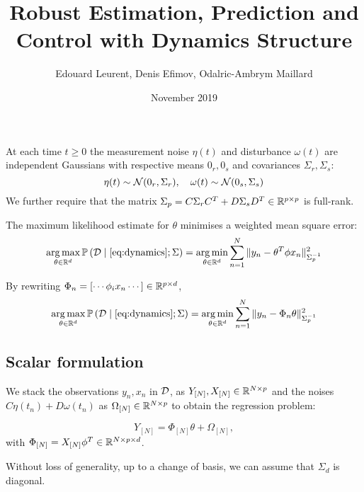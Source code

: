\documentclass{article}
\title{Robust Estimation, Prediction and Control with Dynamics Structure}
\author{Edouard Leurent, Denis Efimov, Odalric-Ambrym Maillard}
\date{November 2019}
\begin{document}
\begin{assumption}
\label{assumpt:noise}
At each time $t\geq0$ the measurement noise $\eta(t)$ and disturbance $\omega(t)$  are independent Gaussians with respective means $0_r, 0_s$ and covariances $\Sigma_r, \Sigma_s$:
\begin{equation*}
    \eta(t)\sim \mathcal{N}(0_r,\Sigma_r),\quad\omega(t)\sim \mathcal{N}(0_s,\Sigma_s)
\end{equation*}
We further require that the matrix $\Sigma_p = C\Sigma_r C^T + D\Sigma_s D^T \in \mathbb{R}^{p\times p}$ is full-rank.
\end{assumption}

\begin{proposition}
\label{prop:mle}
The maximum likelihood estimate for $\theta$ minimises a weighted mean square error:
\begin{equation*}
    \operatorname*{arg\,max}_{\theta\in\mathbb{R}^d} \mathbb{P}\left(\mathcal{D}\;\middle|\;\eqref{eq:dynamics};\Sigma\right) = \operatorname*{arg\,min}_{\theta\in\mathbb{R}^d} \sum_{n=1}^N \|y_n -\theta^T\phi x_n\|_{\Sigma_p^{-1}}^2
\end{equation*}

By rewriting $\Phi_n = [\cdots \phi_i x_n \cdots]\in\mathbb{R}^{p\times d}$,
\begin{equation*}
    \operatorname*{arg\,max}_{\theta\in\mathbb{R}^d} \mathbb{P}\left(\mathcal{D}\;\middle|\;\eqref{eq:dynamics};\Sigma\right) = \operatorname*{arg\,min}_{\theta\in\mathbb{R}^d} \sum_{n=1}^N \|y_n -\Phi_n \theta\|_{\Sigma_p^{-1}}^2
\end{equation*}
\end{proposition}

\subsection{Scalar formulation}

We stack the observations $y_n, x_n$ in $\mathcal{D}$, as $Y_{[N]}, X_{[N]}\in\mathbb{R}^{N\times p}$ and the noises $C\eta(t_n)+D\omega(t_n)$ as $\Omega_{[N]} \in\mathbb{R}^{N\times p}$ to obtain the regression problem:

\begin{equation}
    \label{eq:regression}
    Y_{[N]} = \Phi_{[N]} \theta + \Omega_{[N]},
\end{equation}
with $\Phi_{[N]} = X_{[N]}\phi^T\in \mathbb{R}^{N\times p\times d}$.


\begin{proposition}
\label{prop:decoupling}
Without loss of generality, up to a change of basis, we can assume that $\Sigma_d$ is diagonal.
\end{proposition}
\end{document}
